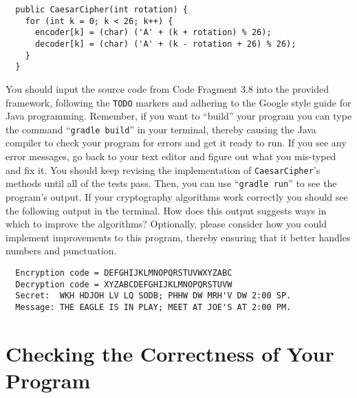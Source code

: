 \documentclass[11pt]{article}
\newcommand{\mainprogram}{\lstinline{CaesarCipher}}
\newcommand{\gradlebuild}{\command{gradle build}}
\newcommand{\gradlerun}{\command{gradle run}}
\newcommand{\command}[1]{``\lstinline{#1}''}
\newcommand{\program}[1]{\lstinline{#1}}
\newcommand{\step}[1]{``{#1}''}
\begin{document}
\vspace*{-.125in}
\begin{verbatim}
  public CaesarCipher(int rotation) {
    for (int k = 0; k < 26; k++) {
      encoder[k] = (char) ('A' + (k + rotation) % 26);
      decoder[k] = (char) ('A' + (k - rotation + 26) % 26);
    }
  }
\end{verbatim}
\vspace*{-.125in}

You should input the source code from Code Fragment 3.8 into the provided
framework, following the \program{TODO} markers and adhering to the Google style
guide for Java programming. Remember, if you want to \step{build} your program
you can type the command \gradlebuild{} in your terminal, thereby causing the
Java compiler to check your program for errors and get it ready to run. If you
see any error messages, go back to your text editor and figure out what you
mis-typed and fix it. You should keep revising the implementation of
\mainprogram's methods until all of the tests pass. Then, you can use
\gradlerun{} to see the program's output. If your cryptography algorithms work
correctly you should see the following output in the terminal. How does this
output suggests ways in which to improve the algorithms? Optionally, please
consider how you could implement improvements to this program, thereby ensuring
that it better handles numbers and punctuation.

\vspace*{-.125in}
\begin{verbatim}
  Encryption code = DEFGHIJKLMNOPQRSTUVWXYZABC
  Decryption code = XYZABCDEFGHIJKLMNOPQRSTUVW
  Secret:  WKH HDJOH LV LQ SODB; PHHW DW MRH'V DW 2:00 SP.
  Message: THE EAGLE IS IN PLAY; MEET AT JOE'S AT 2:00 PM.
\end{verbatim}
\vspace*{-.125in}

\section*{Checking the Correctness of Your Program}
\end{document}
